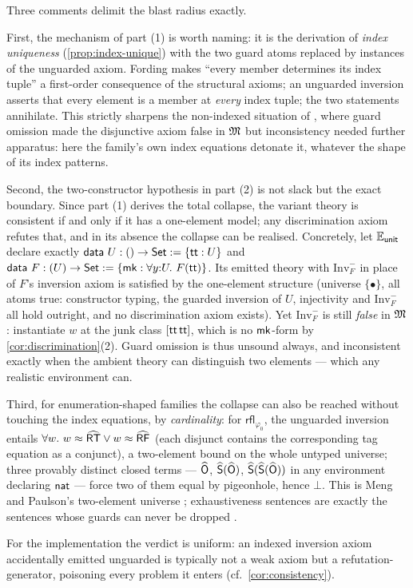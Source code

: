 \begin{remark}
\label{rem:unguarded-general}
Three comments delimit the blast radius exactly.

First, the mechanism of part (1) is worth naming: it is the
derivation of \emph{index uniqueness} (\cref{prop:index-unique}) with
the two guard atoms replaced by instances of the unguarded axiom.
Fording makes ``every member determines its index tuple'' a
first-order consequence of the structural axioms; an unguarded
inversion asserts that every element is a member at \emph{every}
index tuple; the two statements annihilate.  This strictly sharpens
the non-indexed situation of \cite{Extraction2026}, where guard
omission made the disjunctive axiom false in $\mathfrak{M}$ but inconsistency
needed further apparatus: here the family's own index equations
detonate it, whatever the shape of its index patterns.

Second, the two-constructor hypothesis in part (2) is not slack but
the exact boundary.  Since part (1) derives the total collapse, the
variant theory is consistent if and only if it has a one-element
model; any discrimination axiom refutes that, and in its absence the
collapse can be realised.  Concretely, let $\mathbb{E}_{\mathsf{unit}}$
declare exactly $\mathsf{data}\ U : () \to \mathsf{Set} \mathrel{:=} \{\mathsf{tt} :
U\}$ and $\mathsf{data}\ F : (U) \to \mathsf{Set} \mathrel{:=} \{\mathsf{mk} : \forall
y{:}U.\ F(\mathsf{tt})\}$.  Its emitted theory with $\mathrm{Inv}^-_F$
in place of $F$'s inversion axiom is satisfied by the one-element
structure (universe $\{\bullet\}$, all atoms true: constructor typing,
the guarded inversion of $U$, injectivity and $\mathrm{Inv}^-_F$ all
hold outright, and no discrimination axiom exists).  Yet
$\mathrm{Inv}^-_F$ is still \emph{false} in $\mathfrak{M}$: instantiate $w$ at
the junk class $[\mathsf{tt}\,\mathsf{tt}]$, which is no
$\mathsf{mk}$-form by \cref{cor:discrimination}(2).  Guard omission is
thus unsound always, and inconsistent exactly when the ambient theory
can distinguish two elements --- which any realistic environment can.

Third, for enumeration-shaped families the collapse can also be
reached without touching the index equations, by \emph{cardinality}:
for $\mathsf{rfl}_{\varphi_0}$, the unguarded inversion entails
$\forall w.\ w \approx \widehat{\mathsf{RT}} \vee w \approx \widehat{\mathsf{RF}}$
(each disjunct contains the corresponding tag equation as a conjunct),
a two-element bound on the whole untyped universe; three provably
distinct closed terms --- $\widehat{\mathsf{O}}$, $\widehat{\mathsf{S}}(\widehat{\mathsf{O}})$,
$\widehat{\mathsf{S}}(\widehat{\mathsf{S}}(\widehat{\mathsf{O}}))$ in any environment declaring
$\mathsf{nat}$ --- force two of them equal by pigeonhole, hence $\bot$.  This
is Meng and Paulson's two-element universe
\cite[\S 2.3]{MengPaulson2008}; exhaustiveness sentences are exactly
the sentences whose guards can never be dropped
\cite{BlanchetteEtAl2016}.

For the implementation the verdict is uniform: an indexed inversion
axiom accidentally emitted unguarded is typically not a weak axiom but
a refutation-generator, poisoning every problem it enters (cf.\
\cref{cor:consistency}).
\end{remark}

